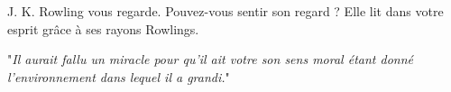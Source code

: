 J. K. Rowling vous regarde. Pouvez-vous sentir son regard ? Elle lit dans votre esprit grâce à ses rayons Rowlings.

"\emph{Il aurait fallu un \emph{miracle} pour qu'il ait \emph{votre} son sens moral étant donné l'environnement dans lequel \emph{il} a grandi.}"

